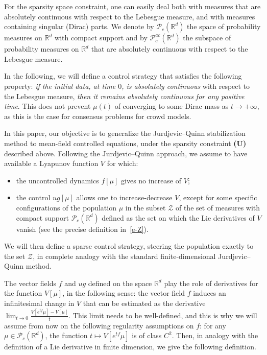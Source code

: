 \documentclass{article}
\newcommand{\R}{\mathbb{R}}
\renewcommand{\P}{\mathcal{P}_c(\R^d)}
\newcommand{\Pac}{\mathcal{P}^{ac}_c(\R^{d})}
\theoremstyle{definition}\newtheorem{remark}{Remark}
\renewcommand{\i}{\item}
\begin{document}
For the sparsity space constraint, one can easily deal both with measures that are absolutely continuous with respect to the Lebesgue measure, and with measures containing singular (Dirac) parts. We denote by $\P$ the space of probability measures on $\R^d$ with compact support and by $\Pac$ the subspace of probability measures on $\R^d$ that are absolutely continuous with respect to the Lebesgue measure.

In the following, we will define a control strategy that satisfies the following property: {\em if the initial data, at time $0$, is absolutely continuous} with respect to the Lebesgue measure, {\em then it remains absolutely continuous for any positive time}. This does not prevent $\mu(t)$ of converging to some Dirac mass as $t\rightarrow+\infty$, as this is the case for consensus problems for crowd models.

\medskip

In this paper, our objective is to generalize the Jurdjevic--Quinn stabilization method \cite{JQ} to mean-field controlled equations, under the sparsity constraint {\bf (U)} described above. Following the Jurdjevic--Quinn approach, we assume to have available a Lyapunov function $V$ for which:
\begin{itemize}
\i the uncontrolled dynamics $f[\mu]$ gives no increase of $V$;
\i the control $u g[\mu]$ allows one to increase-decrease $V$, except for some specific configurations of the population $\mu$ in the subset $\mathcal{Z}$ of the set of measures with compact support $\P$ defined as the set on which the Lie derivatives of $V$ vanish (see the precise definition in~\eqref{e-Z}).
\end{itemize}

We will then define a sparse control strategy, steering the population exactly to the set $\mathcal{Z}$, in complete analogy with the standard finite-dimensional Jurdjevic--Quinn method.

The vector fields $f$ and $ug$ defined on the space $\R^d$ play the role of derivatives for the function $V[\mu]$, in the following sense: the vector field $f$ induces an infinitesimal change in $V$ that can be estimated as the derivative $\lim_{t\to 0}\frac{V[e^{t f}\mu]-V[\mu]}{t}$. This limit needs to be well-defined, and this is why we will assume from now on the following regularity assumptions on $f$: for any $\mu\in\P$, the function $t\mapsto V[e^{tf}\mu]$ is of class $C^2$. Then, in analogy with the definition of a Lie derivative in finite dimension, we give the following definition.
\end{document}
